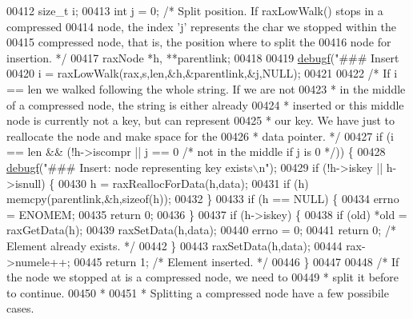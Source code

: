 \begin{DoxyCode}
{{00412     size\_t i;
00413     \textcolor{keywordtype}{int} j = 0; \textcolor{comment}{/* Split position. If raxLowWalk() stops in a compressed}
00414 \textcolor{comment}{                  node, the index 'j' represents the char we stopped within the}
00415 \textcolor{comment}{                  compressed node, that is, the position where to split the}
00416 \textcolor{comment}{                  node for insertion. */}
00417     raxNode *h, **parentlink;
00418 
00419     \hyperlink{rax_8c_a10b215c81aa397dbc44adfb3e436befb}{debugf}(\textcolor{stringliteral}{"### Insert %
00420     i = raxLowWalk(rax,s,len,&h,&parentlink,&j,NULL);
00421 
00422     \textcolor{comment}{/* If i == len we walked following the whole string. If we are not}
00423 \textcolor{comment}{     * in the middle of a compressed node, the string is either already}
00424 \textcolor{comment}{     * inserted or this middle node is currently not a key, but can represent}
00425 \textcolor{comment}{     * our key. We have just to reallocate the node and make space for the}
00426 \textcolor{comment}{     * data pointer. */}
00427     \textcolor{keywordflow}{if} (i == len && (!h->iscompr || j == 0 \textcolor{comment}{/* not in the middle if j is 0 */})) \{
00428         \hyperlink{rax_8c_a10b215c81aa397dbc44adfb3e436befb}{debugf}(\textcolor{stringliteral}{"### Insert: node representing key exists\(\backslash\)n"});
00429         \textcolor{keywordflow}{if} (!h->iskey || h->isnull) \{
00430             h = raxReallocForData(h,data);
00431             \textcolor{keywordflow}{if} (h) memcpy(parentlink,&h,\textcolor{keyword}{sizeof}(h));
00432         \}
00433         \textcolor{keywordflow}{if} (h == NULL) \{
00434             errno = ENOMEM;
00435             \textcolor{keywordflow}{return} 0;
00436         \}
00437         \textcolor{keywordflow}{if} (h->iskey) \{
00438             \textcolor{keywordflow}{if} (old) *old = raxGetData(h);
00439             raxSetData(h,data);
00440             errno = 0;
00441             \textcolor{keywordflow}{return} 0; \textcolor{comment}{/* Element already exists. */}
00442         \}
00443         raxSetData(h,data);
00444         rax->numele++;
00445         \textcolor{keywordflow}{return} 1; \textcolor{comment}{/* Element inserted. */}
00446     \}
00447 
00448     \textcolor{comment}{/* If the node we stopped at is a compressed node, we need to}
00449 \textcolor{comment}{     * split it before to continue.}
00450 \textcolor{comment}{     *}
00451 \textcolor{comment}{     * Splitting a compressed node have a few possibile cases.}
}}}
\end{DoxyCode}
